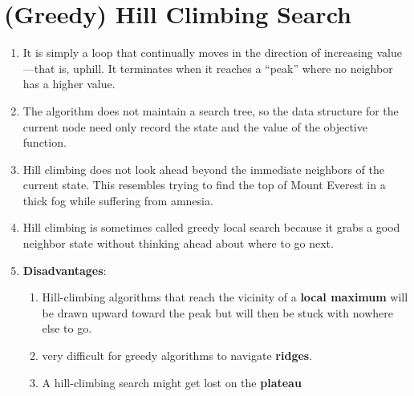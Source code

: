\section{(Greedy) Hill Climbing Search \cite{ai/book/Artificial-Intelligence-A-Modern-Approach/Russell-Norvig}}
\label{AI: Algorithms/(Greedy) Hill Climbing Search}


\begin{enumerate}
    \item It is simply a loop that continually moves in the direction of increasing value—that is, uphill.
    It terminates when it reaches a “peak” where no neighbor has a higher value.
    \hfill \cite{ai/book/Artificial-Intelligence-A-Modern-Approach/Russell-Norvig}

    \item The algorithm does not maintain a search tree, so the data structure for the current node need only record the state and the value of the objective function.
    \hfill \cite{ai/book/Artificial-Intelligence-A-Modern-Approach/Russell-Norvig}

    \item Hill climbing does not look ahead beyond the immediate neighbors of the current state. This resembles trying to find the top of Mount Everest in a thick fog while suffering from amnesia.
    \hfill \cite{ai/book/Artificial-Intelligence-A-Modern-Approach/Russell-Norvig}

    \item Hill climbing is sometimes called greedy local search because it grabs a good neighbor state without thinking ahead about where to go next.
    \hfill \cite{ai/book/Artificial-Intelligence-A-Modern-Approach/Russell-Norvig}

    \item \textbf{Disadvantages}:
    \begin{enumerate}
        \item  Hill-climbing algorithms that reach the vicinity of a \textbf{local maximum} will be drawn upward toward the peak but will then be stuck with nowhere else to go.
        \hfill \cite{ai/book/Artificial-Intelligence-A-Modern-Approach/Russell-Norvig}

        \item very difficult for greedy algorithms to navigate \textbf{ridges}.
        \hfill \cite{ai/book/Artificial-Intelligence-A-Modern-Approach/Russell-Norvig}

        \item A hill-climbing search might get lost on the \textbf{plateau}
        \hfill \cite{ai/book/Artificial-Intelligence-A-Modern-Approach/Russell-Norvig}
    \end{enumerate}
\end{enumerate}

